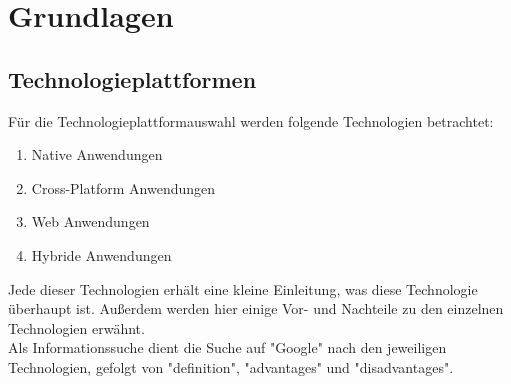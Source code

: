 \documentclass[ngerman]{article}
\begin{document}
    \section{Grundlagen}
    \label{Grundlagen}
    \subsection{Technologieplattformen}
    \label{GrundlagenTechnologiePlattformen}
    Für die Technologieplattformauswahl werden folgende Technologien betrachtet:
    \begin{enumerate}
        \item Native Anwendungen
        \item Cross-Platform Anwendungen
        \item Web Anwendungen
        \item Hybride Anwendungen
    \end{enumerate}
    Jede dieser Technologien erhält eine kleine Einleitung, was diese Technologie überhaupt ist. Außerdem werden hier einige Vor- und Nachteile zu den einzelnen Technologien erwähnt.\\
    Als Informationssuche dient die Suche auf "Google" nach den jeweiligen Technologien, gefolgt von "definition", "advantages" und "disadvantages".
\end{document}
